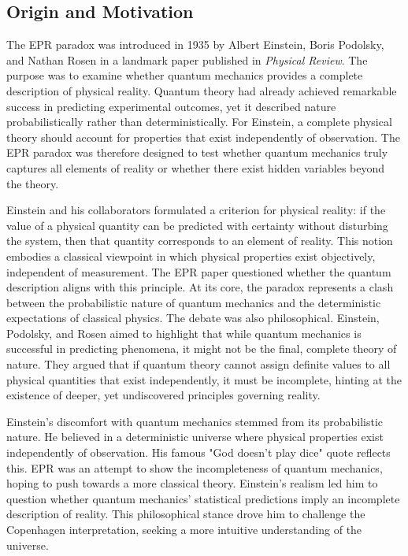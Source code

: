 \documentclass[14pt,a4paper]{extarticle}
\begin{document}
\subsection{Origin and Motivation}
The EPR paradox was introduced in 1935 by Albert Einstein, Boris Podolsky, and Nathan Rosen in a landmark paper published in \textit{Physical Review}. The purpose was to examine whether quantum mechanics provides a complete description of physical reality. Quantum theory had already achieved remarkable success in predicting experimental outcomes, yet it described nature probabilistically rather than deterministically. For Einstein, a complete physical theory should account for properties that exist independently of observation. The EPR paradox was therefore designed to test whether quantum mechanics truly captures all elements of reality or whether there exist hidden variables beyond the theory.

Einstein and his collaborators formulated a criterion for physical reality: if the value of a physical quantity can be predicted with certainty without disturbing the system, then that quantity corresponds to an element of reality. This notion embodies a classical viewpoint in which physical properties exist objectively, independent of measurement. The EPR paper questioned whether the quantum description aligns with this principle. At its core, the paradox represents a clash between the probabilistic nature of quantum mechanics and the deterministic expectations of classical physics. The debate was also philosophical. Einstein, Podolsky, and Rosen aimed to highlight that while quantum mechanics is successful in predicting phenomena, it might not be the final, complete theory of nature. They argued that if quantum theory cannot assign definite values to all physical quantities that exist independently, it must be incomplete, hinting at the existence of deeper, yet undiscovered principles governing reality.

Einstein's discomfort with quantum mechanics stemmed from its probabilistic nature. He believed in a deterministic universe where physical properties exist independently of observation. His famous "God doesn't play dice" quote reflects this. EPR was an attempt to show the incompleteness of quantum mechanics, hoping to push towards a more classical theory. Einstein's realism led him to question whether quantum mechanics' statistical predictions imply an incomplete description of reality. This philosophical stance drove him to challenge the Copenhagen interpretation, seeking a more intuitive understanding of the universe.
\end{document}
